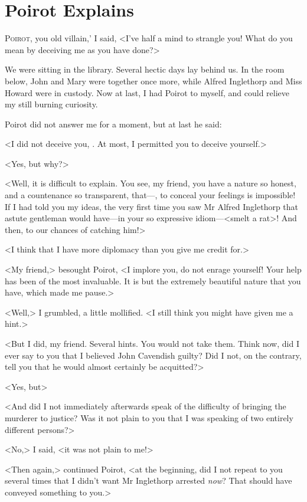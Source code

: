\chapter{Poirot Explains} 
	
\lettrine[ante=`]{P}{oirot,} you old villain,' I said, <I've half a mind to strangle you! What do you mean by deceiving me as you have done?> 

\zz
 We were sitting in the library. Several hectic days lay behind us. In the room below, John and Mary were together once more, while Alfred Inglethorp and Miss Howard were in custody. Now at last, I had Poirot to myself, and could relieve my still burning curiosity. 

 Poirot did not answer me for a moment, but at last he said: 

 <I did not deceive you, . At most, I permitted you to deceive yourself.> 

 <Yes, but why?> 

 <Well, it is difficult to explain. You see, my friend, you have a nature so honest, and a countenance so transparent, that—, to conceal your feelings is impossible! If I had told you my ideas, the very first time you saw Mr Alfred Inglethorp that astute gentleman would have—in your so expressive idiom—<smelt a rat>! And then,  to our chances of catching him!> 

 <I think that I have more diplomacy than you give me credit for.> 

 <My friend,> besought Poirot, <I implore you, do not enrage yourself! Your help has been of the most invaluable. It is but the extremely beautiful nature that you have, which made me pause.> 

 <Well,> I grumbled, a little mollified. <I still think you might have given me a hint.> 

 <But I did, my friend. Several hints. You would not take them. Think now, did I ever say to you that I believed John Cavendish guilty? Did I not, on the contrary, tell you that he would almost certainly be acquitted?> 

 <Yes, but\longdash> 

 <And did I not immediately afterwards speak of the difficulty of bringing the murderer to justice? Was it not plain to you that I was speaking of two entirely different persons?> 

 <No,> I said, <it was not plain to me!> 

 <Then again,> continued Poirot, <at the beginning, did I not repeat to you several times that I didn't want Mr Inglethorp arrested \emph{now}? That should have conveyed something to you.> 

